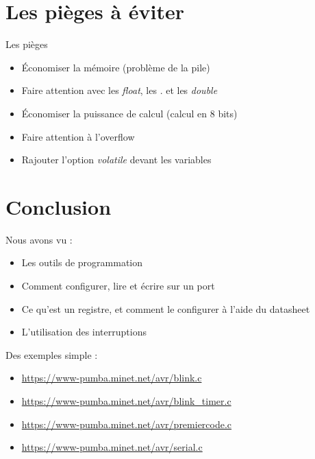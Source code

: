 \documentclass{beamer}
\begin{document}
\section{Les pi\`eges \`a \'eviter}

\begin{frame}
  \begin{alertblock}{Les pi\`eges}
    \pause
    \begin{itemize}
     \item \'Economiser la m\'emoire (probl\`eme de la pile)
     \pause 
     \item Faire attention avec les \emph{float}, les . et les \emph{double}
     \pause
     \item \'Economiser la puissance de calcul (calcul en 8 bits)
     \pause
     \item Faire attention \`a l'overflow
     \pause
     \item Rajouter l'option \emph{volatile} devant les variables
    \end{itemize}

  \end{alertblock}
\end{frame}


\section*{Conclusion}

\begin{frame}
  Nous avons vu :\\
  \begin{itemize}
    \pause
    \item Les outils de programmation
    \pause
    \item Comment configurer, lire et \'ecrire sur un port
    \pause
    \item Ce qu'est un registre, et comment le configurer \`a l'aide du datasheet
    \pause
    \item L'utilisation des interruptions
  \end{itemize}
  \pause 
  Des exemples simple :\\
   \begin{itemize}
    \pause
    \item \hyperlink{https://www-pumba.minet.net/avr/blink.c}{https://www-pumba.minet.net/avr/blink.c}
    \pause
    \item \hyperlink{https://www-pumba.minet.net/avr/blink\_timer.c}{https://www-pumba.minet.net/avr/blink\_timer.c}
    \pause
    \item \hyperlink{https://www-pumba.minet.net/avr/premiercode.c}{https://www-pumba.minet.net/avr/premiercode.c}
    \pause
    \item \hyperlink{https://www-pumba.minet.net/avr/serial.c}{https://www-pumba.minet.net/avr/serial.c}
   \end{itemize}
\end{frame}
\end{document}
